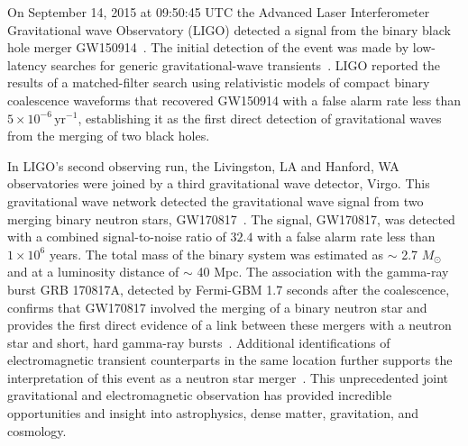 On September 14, 2015 at 09:50:45 UTC the Advanced Laser Interferometer Gravitational wave Observatory (LIGO) detected a signal from the binary black hole merger GW150914~\cite{GW150914-DETECTION}. The initial detection of the event was made by low-latency searches for generic gravitational-wave transients~\cite{GW150914-BURST}. LIGO reported the results of a matched-filter search using relativistic models of compact binary coalescence waveforms that recovered GW150914 with a false alarm rate less than $5 \times 10^{-6} \, \text{yr}^{-1}$, establishing it as the first direct detection of gravitational waves from the merging of two black holes.

In LIGO's second observing run, the Livingston, LA and Hanford, WA observatories were joined by a third gravitational wave detector, Virgo. This gravitational wave network detected the gravitational wave signal from two merging binary neutron stars, GW170817~\cite{abbott2017gw170817}. The signal, GW170817, was detected with a combined signal-to-noise ratio of $32.4$ with a false alarm rate less than $1 \times 10^6$ years. The total mass of the binary system was estimated as $\sim$ 2.7 $M_\odot$ and at a luminosity distance of $\sim$ 40 Mpc. The association with the gamma-ray burst GRB 170817A, detected by Fermi-GBM 1.7 seconds after the coalescence, confirms that GW170817 involved the merging of a binary neutron star and provides the first direct evidence of a link between these mergers with a neutron star and short, hard gamma-ray bursts~\cite{Goldstein_2017}. Additional identifications of electromagnetic transient counterparts in the same location further supports the interpretation of this event as a neutron star merger~\cite{Abbott_2017_mma}. This unprecedented joint gravitational and electromagnetic observation has provided incredible opportunities and insight into astrophysics, dense matter, gravitation, and cosmology.

